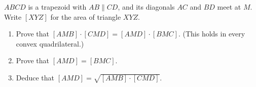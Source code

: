 $ABCD$ is a trapezoid with $AB\parallel CD$, and its diagonals $AC$ and $BD$ meet at $M$. Write $[XYZ]$ for the area of triangle $XYZ$.
\begin{enumerate}
\item[(a)] Prove that $[AMB]\cdot[CMD]=[AMD]\cdot[BMC]$. (This holds in every convex quadrilateral.)
\item[(b)] Prove that $[AMD]=[BMC]$.
\item[(c)] Deduce that $[AMD]=\sqrt{[AMB]\cdot[CMD]}$.
\end{enumerate}
